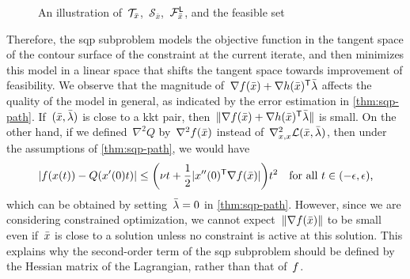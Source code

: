 \begin{figure}[ht]
    \centering
    \caption{An illustration of~$\mathcal{T}_{\bar{\iter}}$,~$\mathcal{S}_{\bar{x}}$,~$\mathcal{F}_{\bar{\iter}}^{\mathsf{L}}$, and the feasible set}
    \label{fig:sqp-path}
\end{figure}

Therefore, the \gls{sqp} subproblem models the objective function in the tangent space of the contour surface of the constraint at the current iterate, and then minimizes this model in a linear space that shifts the tangent space towards improvement of feasibility.
We observe that the magnitude of~$\nabla \obj(\bar{\iter}) + \nabla h(\bar{\iter})^{\T} \bar{\lm}$ affects the quality of the model in general, as indicated by the error estimation in \cref{thm:sqp-path}.
If~$(\bar{\iter}, \bar{\lm})$ is close to a \gls{kkt} pair, then~$\norm{\nabla \obj(\bar{\iter}) + \nabla h(\bar{\iter})^{\T} \bar{\lm}}$ is small.
On the other hand, if we defined~$\nabla^2 Q$ by~$\nabla^2 f(\bar{x})$ instead of~$\nabla_{x, x}^2 \lag(\bar{\iter}, \bar{\lm})$, then under the assumptions of \cref{thm:sqp-path}, we would have
\begin{equation*}
    \abs{\obj(\iter(t)) - Q(x'(0) t)} \le \bigg( \nu t + \frac{1}{2}\abs{\iter''(0)^{\T} \nabla \obj(\bar{\iter})} \bigg) t^2 \quad \text{for all~$t \in (-\epsilon, \epsilon)$,}
\end{equation*}
which can be obtained by setting~$\bar{\lm} = 0$ in \cref{thm:sqp-path}.
However, since we are considering constrained optimization, we cannot expect~$\norm{\nabla \obj(\bar{\iter})}$ to be small even if~$\bar{\iter}$ is close to a solution unless no constraint is active at this solution.
This explains why the second-order term of the \gls{sqp} subproblem should be defined by the Hessian matrix of the Lagrangian, rather than that of~$f$.

